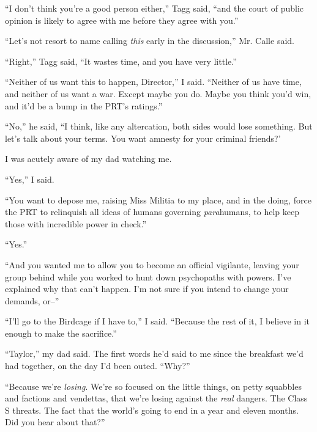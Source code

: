 ``I don't think you're a good person either,'' Tagg said, ``and the court of public opinion is likely to agree with me before they agree with you.''



``Let's not resort to name calling \emph{this} early in the discussion,'' Mr. Calle said.



``Right,'' Tagg said, ``It wastes time, and you have very little.''



``Neither of us want this to happen, Director,'' I said.  ``Neither of us have time, and neither of us want a war.  Except maybe you do.  Maybe you think you'd win, and it'd be a bump in the PRT's ratings.''



``No,'' he said, ``I think, like any altercation, both sides would lose something.  But let's talk about your terms.  You want amnesty for your criminal friends?'



I was acutely aware of my dad watching me.



``Yes,'' I said.



``You want to depose me, raising Miss Militia to my place, and in the doing, force the PRT to relinquish all ideas of humans governing \emph{para}humans, to help keep those with incredible power in check.''



``Yes.''



``And you wanted me to allow you to become an official vigilante, leaving your group behind while you worked to hunt down psychopaths with powers.  I've explained why that can't happen.  I'm not sure if you intend to change your demands, or--''



``I'll go to the Birdcage if I have to,'' I said.  ``Because the rest of it, I believe in it enough to make the sacrifice.''



``Taylor,'' my dad said.  The first words he'd said to me since the breakfast we'd had together, on the day I'd been outed.  ``Why?''



``Because we're \emph{losing}.  We're so focused on the little things, on petty squabbles and factions and vendettas, that we're losing against the \emph{real} dangers.  The Class S threats.  The fact that the world's going to end in a year and eleven months.  Did you hear about that?''



